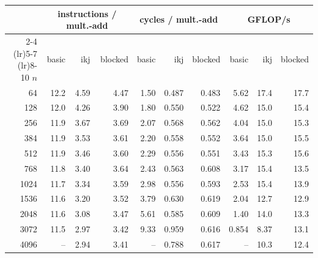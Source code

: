 \begin{tabular}{rrrrrrrrrr}
\toprule
 & \multicolumn{3}{c}{instructions / mult.-add} & \multicolumn{3}{c}{cycles / mult.-add} & \multicolumn{3}{c}{GFLOP/s} \\ \cmidrule(lr){2-4} \cmidrule(lr){5-7} \cmidrule(lr){8-10} $n$ & basic & ikj & blocked & basic & ikj & blocked & basic & ikj & blocked \\
\midrule
64 & 12.2 & 4.59 & 4.47 & 1.50 & 0.487 & 0.483 & 5.62 & 17.4 & 17.7 \\
128 & 12.0 & 4.26 & 3.90 & 1.80 & 0.550 & 0.522 & 4.62 & 15.0 & 15.4 \\
256 & 11.9 & 3.67 & 3.69 & 2.07 & 0.568 & 0.562 & 4.04 & 15.0 & 15.3 \\
384 & 11.9 & 3.53 & 3.61 & 2.20 & 0.558 & 0.552 & 3.64 & 15.0 & 15.5 \\
512 & 11.9 & 3.46 & 3.60 & 2.29 & 0.556 & 0.551 & 3.43 & 15.3 & 15.6 \\
768 & 11.8 & 3.40 & 3.64 & 2.43 & 0.563 & 0.608 & 3.17 & 15.4 & 13.5 \\
1024 & 11.7 & 3.34 & 3.59 & 2.98 & 0.556 & 0.593 & 2.53 & 15.4 & 13.9 \\
1536 & 11.6 & 3.20 & 3.52 & 3.79 & 0.630 & 0.619 & 2.04 & 12.7 & 12.9 \\
2048 & 11.6 & 3.08 & 3.47 & 5.61 & 0.585 & 0.609 & 1.40 & 14.0 & 13.3 \\
3072 & 11.5 & 2.97 & 3.42 & 9.33 & 0.959 & 0.616 & 0.854 & 8.37 & 13.1 \\
4096 & -- & 2.94 & 3.41 & -- & 0.788 & 0.617 & -- & 10.3 & 12.4 \\
\bottomrule
\end{tabular}
